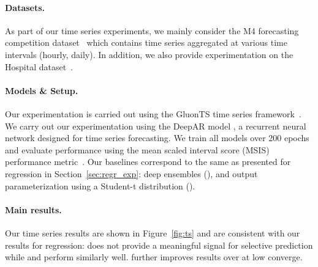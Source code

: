 \paragraph{Datasets.} As part of our time series experiments, we mainly consider the M4 forecasting competition dataset~\citep{makridakis2020m4} which contains time series aggregated at various time intervals (\eg hourly, daily). In addition, we also provide experimentation on the Hospital dataset~\citep{hyndman2015expsmooth}. %

\paragraph{Models \& Setup.} Our experimentation is carried out using the GluonTS time series framework~\citep{alexandrov2019gluonts}. We carry out our experimentation using the DeepAR model \citep{salinas2020deepar}, a recurrent neural network designed for time series forecasting. We train all models over 200 epochs and evaluate performance using the mean scaled interval score (MSIS) performance metric~\citep{makridakis2020m4}. Our baselines correspond to the same as presented for regression in Section~\ref{sec:regr_exp}: deep ensembles (\de), and output parameterization using a Student-t distribution (\odist).

\paragraph{Main results.} Our time series results are shown in Figure~\ref{fig:ts} and are consistent with our results for regression: \odist does not provide a meaningful signal for selective prediction while \sptd and \de perform similarly well. \sptd further improves results over \de at low converge.



